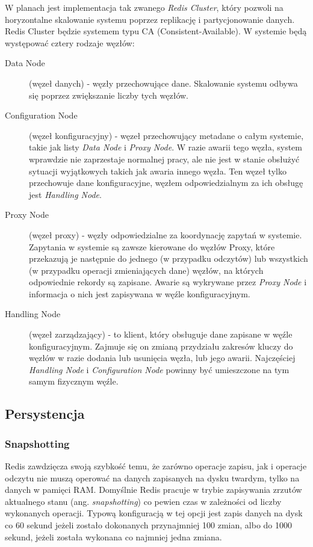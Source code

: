 W planach jest implementacja tak zwanego \emph{Redis Cluster}, który pozwoli na horyzontalne skalowanie systemu poprzez replikację i partycjonowanie danych.
Redis Cluster będzie systemem typu CA (Consistent-Available).
W systemie będą występować cztery rodzaje węzłów:

\begin{description}
 \item[Data Node] (węzeł danych) - węzły przechowujące dane.
 Skalowanie systemu odbywa się poprzez zwiększanie liczby tych węzłów.

 \item[Configuration Node] (węzeł konfiguracyjny) - węzeł przechowujący metadane o całym systemie, takie jak listy \emph{Data Node} i \emph{Proxy Node}.
 W razie awarii tego węzła, system wprawdzie nie zaprzestaje normalnej pracy, ale nie jest w stanie obsłużyć sytuacji wyjątkowych takich jak awaria innego węzła.
 Ten węzeł tylko przechowuje dane konfiguracyjne, węzłem odpowiedzialnym za ich obsługę jest \emph{Handling Node}.

 \item[Proxy Node] (węzeł proxy) - węzły odpowiedzialne za koordynację zapytań w systemie.
 Zapytania w systemie są zawsze kierowane do węzłów Proxy, które przekazują je następnie do jednego (w przypadku odczytów) lub wszystkich (w przypadku operacji zmieniających dane) węzłów, na których odpowiednie rekordy są zapisane.
 Awarie są wykrywane przez \emph{Proxy Node} i informacja o nich jest zapisywana w węźle konfiguracyjnym.

 \item[Handling Node] (węzeł zarządzający) - to klient, który obsługuje dane zapisane w węźle konfiguracyjnym.
 Zajmuje się on zmianą przydziału zakresów kluczy do węzłów w razie dodania lub usunięcia węzła, lub jego awarii.
 Najczęściej \emph{Handling Node} i \emph{Configuration Node} powinny być umieszczone na tym samym fizycznym węźle.
\end{description}

\subsection*{Persystencja}

\subsubsection*{Snapshotting}

Redis zawdzięcza swoją szybkość temu, że zarówno operacje zapisu, jak i operacje odczytu nie muszą operować na danych zapisanych na dysku twardym, tylko na danych w pamięci RAM.
Domyślnie Redis pracuje w trybie zapisywania zrzutów aktualnego stanu (ang. \emph{snapshotting}) co pewien czas w zależności od liczby wykonanych operacji.
Typową konfiguracją w tej opcji jest zapis danych na dysk co 60 sekund jeżeli zostało dokonanych przynajmniej 100 zmian, albo do 1000 sekund, jeżeli została wykonana co najmniej jedna zmiana.

